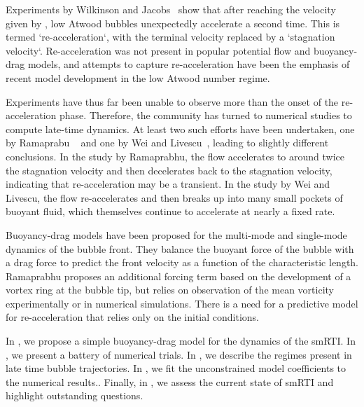 Experiments by Wilkinson and Jacobs~\cite{Wilkinson2007} show that after reaching the velocity given by , low Atwood bubbles unexpectedly accelerate a second time.
This is termed `re-acceleration`, with the terminal velocity replaced by a `stagnation velocity`.
Re-acceleration was not present in popular potential flow and buoyancy-drag models, and attempts to capture re-acceleration have been the emphasis of recent model development in the low Atwood number regime.

Experiments have thus far been unable to observe more than the onset of the re-acceleration phase.
Therefore, the community has turned to numerical studies to compute late-time dynamics.
At least two such efforts have been undertaken, one by Ramaprabu \etal~\cite{Ramaprabhu2012} and one by Wei and Livescu~\cite{Wei2012}, leading to slightly different conclusions.
In the study by Ramaprabhu, the flow accelerates to around twice the stagnation velocity and then decelerates back to the stagnation velocity, indicating that re-acceleration may be a transient.
In the study by Wei and Livescu, the flow re-accelerates and then breaks up into many small pockets of buoyant fluid, which themselves continue to accelerate at nearly a fixed rate.

Buoyancy-drag models have been proposed for the multi-mode and single-mode dynamics of the bubble front.
They balance the buoyant force of the bubble with a drag force to predict the front velocity as a function of the characteristic length.
Ramaprabhu proposes an additional forcing term based on the development of a vortex ring at the bubble tip, but relies on observation of the mean vorticity experimentally or in numerical simulations.
There is a need for a predictive model for re-acceleration that relies only on the initial conditions.

In , we propose a simple buoyancy-drag model for the dynamics of the smRTI.
In , we present a battery of numerical trials.
In , we describe the regimes present in late time bubble trajectories.
In , we fit the unconstrained model coefficients to the numerical results..
Finally, in , we assess the current state of smRTI and highlight outstanding questions.

